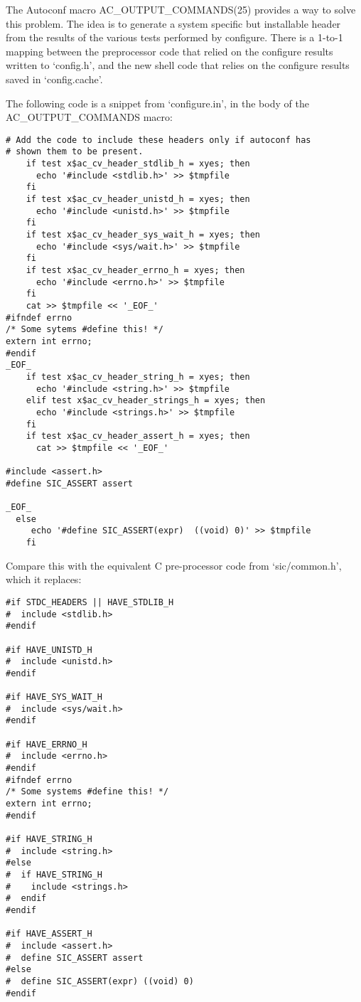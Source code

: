     The Autoconf macro AC\_{}OUTPUT\_{}COMMANDS(25) provides a way to solve this problem. The idea is to generate a system specific but installable header from the results of the various tests performed by configure. There is a 1-to-1 mapping between the preprocessor code that relied on the configure results written to `config.h', and the new shell code that relies on the configure results saved in `config.cache'.

The following code is a snippet from `configure.in', in the body of the AC\_{}OUTPUT\_{}COMMANDS macro: 

\begin{Verbatim}[frame=single]
# Add the code to include these headers only if autoconf has
# shown them to be present.
    if test x$ac_cv_header_stdlib_h = xyes; then
      echo '#include <stdlib.h>' >> $tmpfile
    fi
    if test x$ac_cv_header_unistd_h = xyes; then
      echo '#include <unistd.h>' >> $tmpfile
    fi
    if test x$ac_cv_header_sys_wait_h = xyes; then
      echo '#include <sys/wait.h>' >> $tmpfile
    fi
    if test x$ac_cv_header_errno_h = xyes; then
      echo '#include <errno.h>' >> $tmpfile
    fi
    cat >> $tmpfile << '_EOF_'
#ifndef errno
/* Some sytems #define this! */
extern int errno;
#endif
_EOF_
    if test x$ac_cv_header_string_h = xyes; then
      echo '#include <string.h>' >> $tmpfile
    elif test x$ac_cv_header_strings_h = xyes; then
      echo '#include <strings.h>' >> $tmpfile
    fi
    if test x$ac_cv_header_assert_h = xyes; then
      cat >> $tmpfile << '_EOF_'

#include <assert.h>
#define SIC_ASSERT assert

_EOF_
  else
     echo '#define SIC_ASSERT(expr)  ((void) 0)' >> $tmpfile
    fi
\end{Verbatim}

Compare this with the equivalent C pre-processor code from `sic/common.h', which it replaces:

 	
\begin{Verbatim}[frame=single]
#if STDC_HEADERS || HAVE_STDLIB_H
#  include <stdlib.h>
#endif

#if HAVE_UNISTD_H
#  include <unistd.h>
#endif

#if HAVE_SYS_WAIT_H
#  include <sys/wait.h>
#endif

#if HAVE_ERRNO_H
#  include <errno.h>
#endif
#ifndef errno
/* Some systems #define this! */
extern int errno;
#endif

#if HAVE_STRING_H
#  include <string.h>
#else
#  if HAVE_STRING_H
#    include <strings.h>
#  endif
#endif

#if HAVE_ASSERT_H
#  include <assert.h>
#  define SIC_ASSERT assert
#else
#  define SIC_ASSERT(expr) ((void) 0)
#endif
\end{Verbatim}

